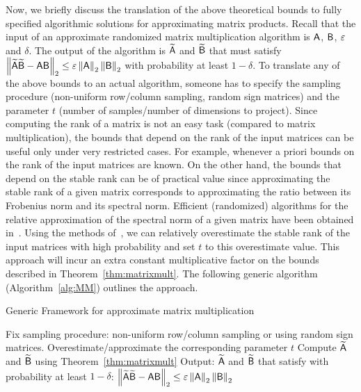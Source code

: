 %
Now, we briefly discuss the translation of the above theoretical bounds to fully specified algorithmic solutions for approximating matrix products. Recall that the input of an approximate randomized matrix multiplication algorithm is $\matA$, $\matB$, $\eps$ and $\delta$. The output of the algorithm is $\widetilde{{\mathsf{A} }}$ and $\widetilde{{\mathsf{B} }}$ that must satisfy $\left\|\widetilde{{\mathsf{A} }}\widetilde{{\mathsf{B} }} -{\mathsf{A} } {\mathsf{B} } \right\|_2 \leq \varepsilon \left\|{\mathsf{A} }\right\|_2 \left\|{\mathsf{B} }\right\|_2$ with probability at least $1-\delta$. To translate any of the above bounds to an actual algorithm, someone has to specify the sampling procedure (non-uniform row/column sampling, random sign matrices) and the parameter $t$ (number of samples/number of dimensions to project). Since computing the rank of a matrix is not an easy task (compared to matrix multiplication), the bounds that depend on the rank of the input matrices can be useful only under very restricted cases. For example, whenever a priori bounds on the rank of the input matrices are known. On the other hand, the bounds that depend on the stable rank can be of practical value since approximating the stable rank of a given matrix corresponds to approximating the ratio between its Frobenius norm and its spectral norm. Efficient (randomized) algorithms for the relative approximation of the spectral norm of a given matrix have been obtained in~\cite{KW92}. Using the methods of~\cite{KW92}, we can relatively overestimate the stable rank of the input matrices with high probability and set $t$ to this overestimate value. This approach will incur an extra constant multiplicative factor on the bounds described in Theorem~\ref{thm:matrixmult}. The following generic algorithm (Algorithm~\ref{alg:MM}) outlines the approach.
%
\begin{algorithm}{}
	\caption{Generic Framework for approximate matrix multiplication}\label{alg:MM}
\begin{algorithmic}[1]
\Procedure{}{$\matA$, $\matB$, $\eps$, $\delta$}
\State Fix sampling procedure: non-uniform row/column sampling or using random sign matrices.
\State Overestimate/approximate the corresponding parameter $t$
\State Compute $\widetilde{{\mathsf{A} }}$ and $\widetilde{{\mathsf{B} }}$ using Theorem~\ref{thm:matrixmult}
\State Output: $\widetilde{{\mathsf{A} }}$ and $\widetilde{{\mathsf{B} }}$ that satisfy with probability at least $1-\delta$: $\left\|\widetilde{{\mathsf{A} }}\widetilde{{\mathsf{B} }} - {\mathsf{A} } {\mathsf{B} }\right\|_2 \leq \varepsilon \left\|{\mathsf{A} }\right\|_2 \left\|{\mathsf{B} }\right\|_2$
\EndProcedure
\end{algorithmic}
\end{algorithm}
%

